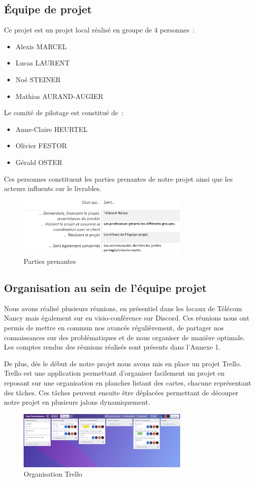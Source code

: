 \documentclass[french,a4paper]{article}
\begin{document}
\subsection{Équipe de projet}
Ce projet est un projet local réalisé en groupe de 4 personnes~:
\begin{itemize}
    \item Alexis MARCEL
    \item Lucas LAURENT
    \item Noé STEINER
    \item Mathias AURAND-AUGIER
\end{itemize}
Le comité de pilotage est constitué de~:
\begin{itemize}
    \item Anne-Claire HEURTEL
    \item Olivier FESTOR
    \item Gérald OSTER
\end{itemize}
Ces personnes constituent les parties prenantes de notre projet ainsi que les acteurs influents sur le livrables.
\begin{figure}[H]
    \centering
    \includegraphics[width=0.75\textwidth]{img/parties_prenantes.png}
    \caption{Parties prenantes}
\end{figure} 
\subsection{Organisation au sein de l’équipe projet}
Nous avons réalisé plusieurs réunions, en présentiel dans les locaux de Télécom Nancy mais également sur en visio-conférence sur Discord. Ces réunions nous ont permis de mettre en commun nos avancés régulièrement, de partager nos connaissances sur des problématiques et de nous organiser de manière optimale.
Les comptes rendus des réunions réalisés sont présents dans l’Annexe 1.

De plus, dès le début de notre projet nous avons mis en place un projet Trello. Trello est une application permettant d’organiser facilement un projet en reposant sur une organisation en planches listant des cartes, chacune représentant des tâches. Ces tâches peuvent ensuite être déplacées permettant de découper notre projet en plusieurs jalons dynamiquement.
\begin{figure}[H]
    \centering
    \includegraphics[width=0.75\textwidth]{img/trello.png}
    \caption{Organisation Trello}
\end{figure} 
\end{document}
